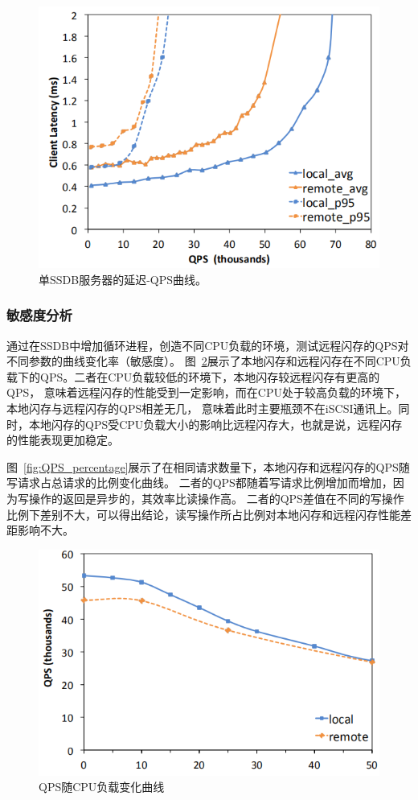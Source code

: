 \begin{figure}
\centering
\includegraphics[scale=0.8]{Figures/storage/QPS_latency.jpg}
\decoRule
\caption{单SSDB服务器的延迟-QPS曲线。}
\label{fig:QPS_latency}
\end{figure}

\subsubsection{敏感度分析}
通过在SSDB中增加循环进程，创造不同CPU负载的环境，测试远程闪存的QPS对不同参数的曲线变化率（敏感度）。
图~\ref{fig:QPS_CPUintensity}展示了本地闪存和远程闪存在不同CPU负载下的QPS。二者在CPU负载较低的环境下，本地闪存较远程闪存有更高的QPS，
意味着远程闪存的性能受到一定影响，而在CPU处于较高负载的环境下，本地闪存与远程闪存的QPS相差无几，
意味着此时主要瓶颈不在iSCSI通讯上。同时，本地闪存的QPS受CPU负载大小的影响比远程闪存大，也就是说，远程闪存的性能表现更加稳定。

图~\ref{fig:QPS_percentage}展示了在相同请求数量下，本地闪存和远程闪存的QPS随写请求占总请求的比例变化曲线。
二者的QPS都随着写请求比例增加而增加，因为写操作的返回是异步的，其效率比读操作高。
二者的QPS差值在不同的写操作比例下差别不大，可以得出结论，读写操作所占比例对本地闪存和远程闪存性能差距影响不大。

\begin{figure}
\centering
\includegraphics[scale=0.8]{Figures/storage/QPS_CPUintensity.jpg}
\decoRule
\caption{QPS随CPU负载变化曲线}
\label{fig:QPS_CPUintensity}
\end{figure}

